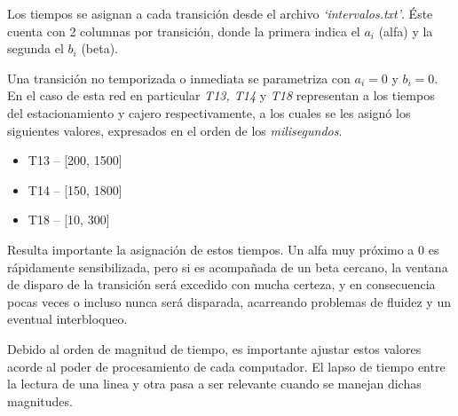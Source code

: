 \documentclass[12pt,a4paper]{article}
\begin{document}
Los tiempos se asignan a cada transición desde el archivo \textit{`intervalos.txt'}. Éste cuenta con 2 columnas por transición, donde la primera indica el \textit{$a_i$} (alfa) y la segunda el \textit{$b_i$} (beta). 

Una transición no temporizada o inmediata se parametriza con $a_i = 0 $ y $b_i = 0$. En el caso de esta red en particular \textit{T13, T14} y \textit{T18} representan a los tiempos del estacionamiento y cajero respectivamente, a los cuales se les asignó los siguientes valores, expresados en el orden de los \textit{milisegundos}.

\begin{itemize}[leftmargin=1.5cm]
    \item T13 -- [200, 1500]
    \item T14 -- [150, 1800]
    \item T18 -- [10, 300]
\end{itemize}

Resulta importante la asignación de estos tiempos. Un alfa muy próximo a 0 es rápidamente sensibilizada, pero si es acompañada de un beta cercano, la ventana de disparo de la transición será excedido con mucha certeza, y en consecuencia pocas veces o incluso nunca será disparada, acarreando problemas de fluidez y un eventual interbloqueo.

Debido al orden de magnitud de tiempo, es importante ajustar estos valores acorde al poder de procesamiento de cada computador. El lapso de tiempo entre la lectura de una linea y otra pasa a ser relevante cuando se manejan dichas magnitudes.
\end{document}
